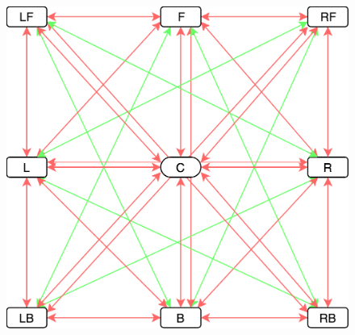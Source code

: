 \begin{figure}
	\centering
	\includegraphics[width=.5\linewidth]{figures/pilot1_top_down_scene_view.png}
	

\end{figure}
